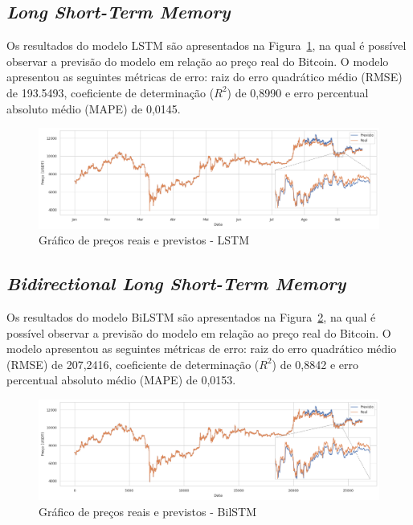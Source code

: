 \subsection{\textit{Long Short-Term Memory}}

Os resultados do modelo LSTM são apresentados na Figura~\ref{figura:lstmOutput}, na qual é possível observar a previsão do modelo em relação ao preço real do Bitcoin. O modelo apresentou as seguintes métricas de erro: raiz do erro quadrático médio (RMSE) de 193.5493, coeficiente de determinação ($R^2$) de 0,8990 e erro percentual absoluto médio (MAPE) de 0,0145.

\begin{figure}[!htb] \centering
  \caption{Gráfico de preços reais e previstos - LSTM} \label{figura:lstmOutput}
  \begin{varwidth}{\linewidth}
    \includegraphics[width=16cm]{figuras/lstmOutput.png}
  \end{varwidth}
\end{figure}



\subsection{\textit{Bidirectional Long Short-Term Memory}}

Os resultados do modelo BiLSTM são apresentados na Figura~\ref{figura:bilstmOutput}, na qual é possível observar a previsão do modelo em relação ao preço real do Bitcoin. O modelo apresentou as seguintes métricas de erro: raiz do erro quadrático médio (RMSE) de 207,2416, coeficiente de determinação ($R^2$) de 0,8842 e erro percentual absoluto médio (MAPE) de 0,0153.

\begin{figure}[!htb] \centering
  \caption{Gráfico de preços reais e previstos - BilSTM} \label{figura:bilstmOutput}
  \begin{varwidth}{\linewidth}
    \includegraphics[width=16cm]{figuras/bilstmOutput.png}
  \end{varwidth}
\end{figure}

